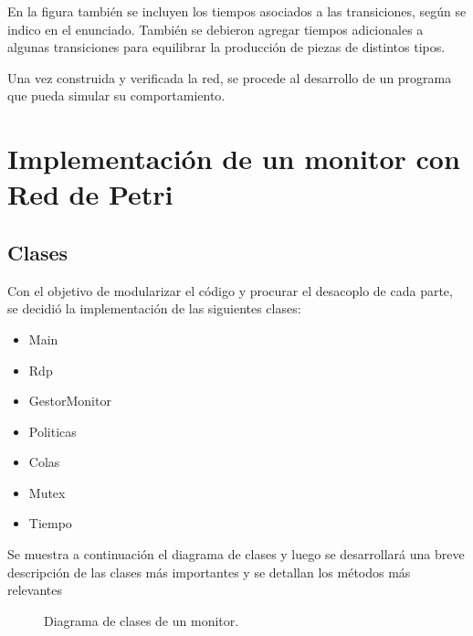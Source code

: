 \documentclass[10pt, a4paper,notitlepage]{article}
\begin{document}
En la figura también se incluyen los tiempos asociados a las transiciones, según se indico en el enunciado. También se debieron agregar tiempos adicionales a algunas transiciones para equilibrar la producción de piezas de distintos tipos.

Una vez construida y verificada la red, se procede al desarrollo de un programa que pueda simular su comportamiento.



\section{Implementación de un monitor con Red de Petri}
\subsection{Clases}
Con el objetivo de modularizar el código y procurar el desacoplo de cada parte, se decidió la implementación de las siguientes clases:

\begin{itemize}
	\item Main
	\item Rdp
	\item GestorMonitor
	\item Politicas
	\item Colas
	\item Mutex
	\item Tiempo
\end{itemize}

Se muestra a continuación el diagrama de clases y luego se desarrollará una breve descripción de las clases más importantes y se detallan los métodos más relevantes
\begin{figure}[H] %
	\caption{Diagrama de clases de un monitor.}
	\label{fig:clases}
\end{figure}
\end{document}

